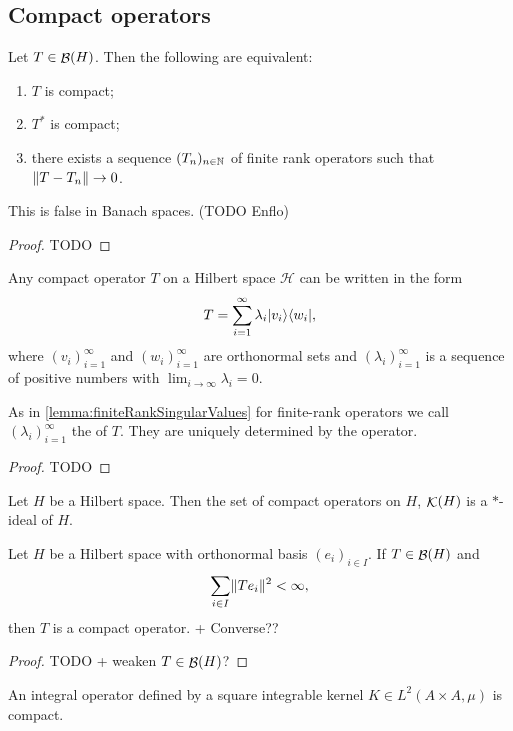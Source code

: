 \subsection{Compact operators}
\begin{proposition}
Let $T\in\mathop{\mathcal{B}}(H)$. Then the following are equivalent:
\begin{enumerate}
\item $T$ is compact;
\item $T^*$ is compact;
\item there exists a sequence $(T_n)_{n\in\mathbb{N}}$ of finite rank operators such that $\lVert T-T_n\rVert\to 0$.
\end{enumerate}
\end{proposition}
This is false in Banach spaces. (TODO Enflo)
\begin{proof}
TODO
\end{proof}
\begin{corollary}
Any compact operator $T$ on a Hilbert space $\mathcal{H}$ can be written in the form
\[ T = \sum_{i=1}^\infty \lambda_i |v_i\rangle\langle w_i|, \]
where $(v_i)_{i=1}^\infty$ and $(w_i)_{i=1}^\infty$ are orthonormal sets and $(\lambda_i)_{i=1}^\infty$ is a sequence of positive numbers with $\lim_{i\to\infty}\lambda_i = 0$.
\end{corollary}
As in \ref{lemma:finiteRankSingularValues} for finite-rank operators we call $(\lambda_i)_{i=1}^\infty$ the  of $T$. They are uniquely determined by the operator.
\begin{proof}
TODO
\end{proof}

\begin{lemma}
Let $H$ be a Hilbert space. Then the set of compact operators on $H$, $\mathop{\mathcal{K}}(H)$ is a $*$-ideal of $H$. 
\end{lemma}

\begin{proposition}
Let $H$ be a Hilbert space with orthonormal basis $(e_i)_{i\in I}$. If $T\in\mathop{\mathcal{B}}(H)$ and
\[ \sum_{i\in I}\lVert Te_i\rVert^2  < \infty, \]
then $T$ is a compact operator. + Converse??
\end{proposition}
\begin{proof}
TODO + weaken $T\in\mathop{\mathcal{B}}(H)$?
\end{proof}
\begin{corollary}
An integral operator defined by a square integrable kernel $K\in L^2(A\times A, \mu)$ is compact.
\end{corollary}

